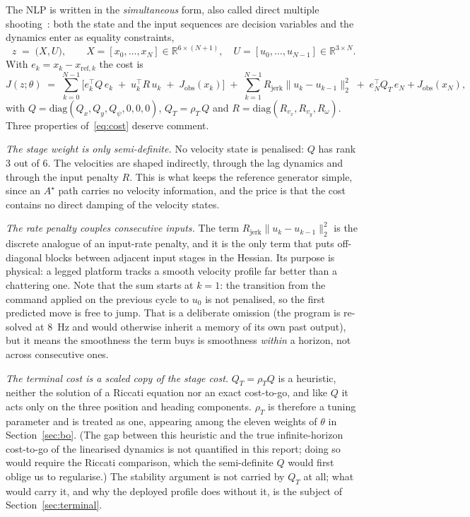 \documentclass[11pt,a4paper]{article}
\newcommand{\R}{\mathbb{R}}
\newcommand{\astar}{$A^\star$}
\newcommand{\Jobs}{J_{\mathrm{obs}}}
\newcommand{\Rjerk}{R_{\mathrm{jerk}}}
\begin{document}
The NLP is written in the \emph{simultaneous} form, also called direct multiple shooting~\cite{bock1984multipleshooting}: both the state and
the input sequences are decision variables and the dynamics enter as equality constraints,
\begin{equation}
  z \;=\; \big(X,U\big),\qquad X=[x_0,\dots,x_N]\in\R^{6\times(N+1)},\quad U=[u_0,\dots,u_{N-1}]\in\R^{3\times N}.
\end{equation}
With $e_k=x_k-x_{\mathrm{ref},k}$ the cost is
\begin{equation}
  J(z;\theta) \;=\;
  \sum_{k=0}^{N-1}\Big[e_k^{\!\top} Q\, e_k
  \;+\; u_k^{\!\top} R\, u_k
  \;+\; \Jobs(x_k)\Big]
  \;+\;\sum_{k=1}^{N-1}\Rjerk\|u_k-u_{k-1}\|_2^2
  \;+\;e_N^{\!\top} Q_T\, e_N + \Jobs(x_N),
  \label{eq:cost}
\end{equation}
with $Q=\mathrm{diag}(Q_x,Q_y,Q_\psi,0,0,0)$, $Q_T=\rho_T\,Q$ and $R=\mathrm{diag}(R_{v_x},R_{v_y},R_\omega)$.
Three properties of~\eqref{eq:cost} deserve comment.

\smallskip\noindent \emph{The stage weight is only semi-definite.} No velocity state is penalised: $Q$ has rank $3$ out of $6$.
The velocities are shaped indirectly, through the lag dynamics and through the input penalty $R$. This is
what keeps the reference generator simple, since an \astar{} path carries no velocity information, and the
price is that the cost contains no direct damping of the velocity states.

\smallskip\noindent \emph{The rate penalty couples consecutive inputs.} The term $\Rjerk\|u_k-u_{k-1}\|_2^2$ is the discrete
analogue of an input-rate penalty, and it is the only term that puts off-diagonal blocks between adjacent
input stages in the Hessian. Its purpose is physical: a legged platform tracks a smooth velocity profile far
better than a chattering one. Note that the sum starts at $k=1$: the transition from the command applied on
the previous cycle to $u_0$ is not penalised, so the first predicted move is free to jump. That is a
deliberate omission (the program is re-solved at $8$~Hz and would otherwise inherit a memory of its own
past output), but it means the smoothness the term buys is smoothness \emph{within} a horizon, not across
consecutive ones.

\smallskip\noindent \emph{The terminal cost is a scaled copy of the stage cost.} $Q_T=\rho_T Q$ is a heuristic, neither the
solution of a Riccati equation nor an exact cost-to-go, and like $Q$ it acts only on the three position and
heading components. $\rho_T$ is therefore a tuning parameter and is treated as one, appearing among the
eleven weights of $\theta$ in Section~\ref{sec:bo}. (The gap between this heuristic and the true
infinite-horizon cost-to-go of the linearised dynamics is not quantified in this report; doing so would
require the Riccati comparison, which the semi-definite $Q$ would first oblige us to regularise.) The
stability argument is not carried by $Q_T$ at all; what would carry it, and why the deployed profile does
without it, is the subject of Section~\ref{sec:terminal}.
\end{document}
